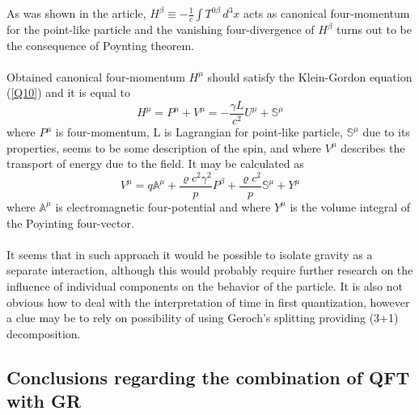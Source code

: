 \documentclass[aps,prx,preprint,groupedaddress,showkeys]{revtex4-2}
\begin{document}
As was shown in the article, $H^{\beta} \equiv - \frac{1}{c} \int T^{0 \beta} \, d^3 x$ acts as canonical four-momentum for the point-like particle and the vanishing four-divergence of $H^{\beta}$ turns out to be the consequence of Poynting theorem.\\
~\\
Obtained canonical four-momentum $H^{\mu}$ should satisfy the Klein-Gordon equation (\ref{Q10}) and it is equal to  
\begin{equation} \label{Q2}
H^{\mu} = P^{\mu} + V^{\mu} = - \frac{\gamma L}{c^2}U^{\mu} + \mathbb{S}^{\mu}
\end{equation}
where $P^{\mu}$ is four-momentum, L is Lagrangian for point-like particle, $\mathbb{S}^{\mu}$ due to its properties, seems to be some description of the spin, and where $V^{\mu}$ describes the transport of energy due to the field. It may be calculated as
\begin{equation} \label{QV1}
V^{\mu} = q \mathbb{A}^{\mu} + \frac{\varrho c^2 \gamma^2}{p} P^{\beta} + \frac{\varrho c^2}{p} \mathbb{S}^{\mu} + Y^{\mu} 
\end{equation}
where $\mathbb{A}^{\mu}$ is electromagnetic four-potential and where $Y^{\mu}$ is the volume integral of the Poyinting four-vector. \\
~\\
It seems that in such approach it would be possible to isolate gravity as a separate interaction, although this would probably require further research on the influence of individual components on the behavior of the particle. It is also not obvious how to deal with the interpretation of time in first quantization, however a clue may be to rely on possibility of using Geroch's splitting \cite{GEROCH} providing (3+1) decomposition.


\subsection{Conclusions regarding the combination of QFT with GR}
\end{document}
